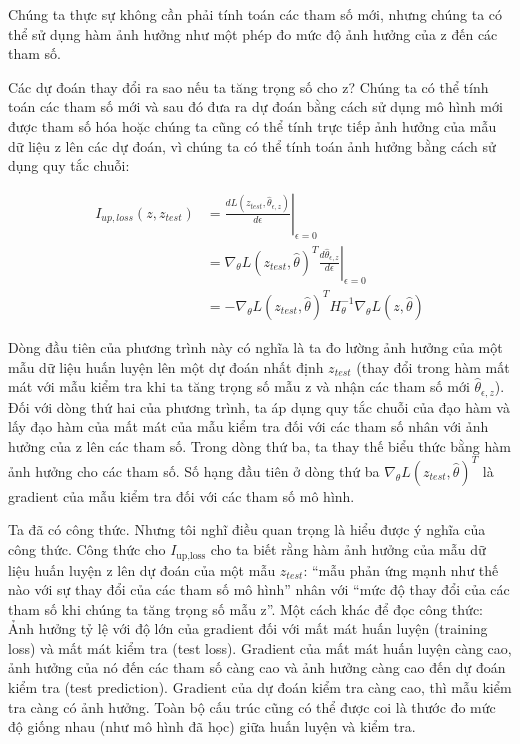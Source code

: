 Chúng ta thực sự không cần phải tính toán các tham số mới, nhưng chúng ta có thể sử dụng hàm ảnh hưởng như một phép đo mức độ ảnh hưởng của z đến các tham số.

Các dự đoán thay đổi ra sao nếu ta tăng trọng số cho z? Chúng ta có thể tính toán các tham số mới và sau đó đưa ra dự đoán bằng cách sử dụng mô hình mới được tham số hóa hoặc chúng ta cũng có thể tính trực tiếp ảnh hưởng của mẫu dữ liệu z lên các dự đoán, vì chúng ta có thể tính toán ảnh hưởng bằng cách sử dụng quy tắc chuỗi:

\begin{align*}I_{up,loss}(z,z_{test})&=\left.\frac{d{}L(z_{test},\hat{\theta}_{\epsilon,z})}{d\epsilon}\right|_{\epsilon=0}\\&=\left.\nabla_{\theta}L(z_{test},\hat{\theta})^T\frac{d\hat{\theta}_{\epsilon,z}}{d\epsilon}\right|_{\epsilon=0}\\&=-\nabla_{\theta}L(z_{test},\hat{\theta})^T{}H^{-1}_{\theta}\nabla_{\theta}L(z,\hat{\theta})\end{align*}

Dòng đầu tiên của phương trình này có nghĩa là ta đo lường ảnh hưởng của một mẫu dữ liệu huấn luyện lên một dự đoán nhất định \begin{math} z_{test} \end{math} (thay đổi trong hàm mất mát với mẫu kiểm tra khi ta tăng trọng số mẫu z và nhận các tham số mới \begin{math} \hat{\theta}_{\epsilon,z}  \end{math}). Đối với dòng thứ hai của phương trình, ta áp dụng quy tắc chuỗi của đạo hàm và lấy đạo hàm của mất mát của mẫu kiểm tra đối với các tham số nhân với ảnh hưởng của z lên các tham số. Trong dòng thứ ba, ta thay thế biểu thức bằng hàm ảnh hưởng cho các tham số. Số hạng đầu tiên ở dòng thứ ba  \begin{math} \nabla_{\theta}L(z_{test},\hat{\theta})^T{} \end{math} là gradient của mẫu kiểm tra đối với các tham số mô hình.

Ta đã có công thức. Nhưng tôi nghĩ điều quan trọng là hiểu được ý nghĩa của công thức. Công thức cho \begin{math}  I_{\text{up,loss}} \end{math} cho ta biết rằng hàm ảnh hưởng của mẫu dữ liệu huấn luyện z lên dự đoán của một mẫu \begin{math} z_{test} \end{math}: ``mẫu phản ứng mạnh như thế nào với sự thay đổi của các tham số mô hình'' nhân với ``mức độ thay đổi của các tham số khi chúng ta tăng trọng số mẫu z''. Một cách khác để đọc công thức: Ảnh hưởng tỷ lệ với độ lớn của gradient đối với mất mát huấn luyện (training loss) và mất mát kiểm tra (test loss). Gradient của mất mát huấn luyện càng cao, ảnh hưởng của nó đến các tham số càng cao và ảnh hưởng càng cao đến dự đoán kiểm tra (test prediction). Gradient của dự đoán kiểm tra càng cao, thì mẫu kiểm tra càng có ảnh hưởng. Toàn bộ cấu trúc cũng có thể được coi là thước đo mức độ giống nhau (như mô hình đã học) giữa huấn luyện và kiểm tra.

